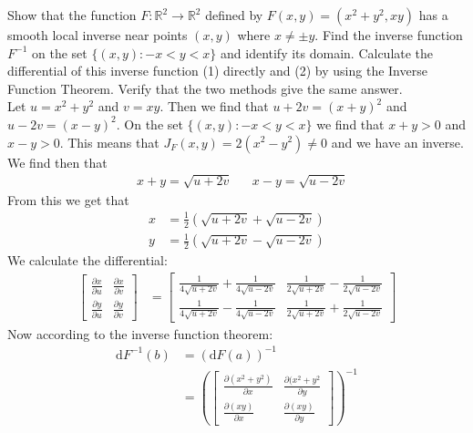 \documentclass[12pt]{book}
\newcommand{\R}{\mathbb{R}}
\newenvironment{exercise}[2][Exercise]{\begin{trivlist}
\item[\hskip \labelsep {\bfseries #1}\hskip \labelsep {\bfseries #2.}]}{\end{trivlist}}
\begin{document}
\begin{exercise}{9.6.2}
    Show that the function $F: \R^2 \to \R^2$ defined by $F(x,y) = (x^2+y^2, x y)$ has a smooth local inverse near points $(x,y)$ where $x \neq \pm y$. Find the inverse function $F^{-1}$ on the set $\{(x,y) : -x < y < x\}$ and identify its domain. Calculate the differential of this inverse function (1) directly and (2) by using the Inverse Function Theorem. Verify that the two methods give the same answer.  \\

    Let $u=x^2+y^2$ and $v = x y$. Then we find that $u+2v = (x+y)^2$ and $u-2v=(x-y)^2$. On the set $\{(x,y) : -x < y < x\}$ we find that $x+y>0$ and $x-y>0$. This means that $J_F (x,y) = 2 (x^2-y^2)\neq 0$ and we have an inverse. We find then that
    \begin{align*}
        &x+y=\sqrt{u+2v}        &&x-y=\sqrt{u-2v}
    \end{align*}
    From this we get that
    \begin{align*}
        x &= \frac{1}{2} \left( \sqrt{u+2v} + \sqrt{u-2v} \right) \\
        y &= \frac{1}{2} \left( \sqrt{u+2v} - \sqrt{u-2v} \right)
    \end{align*}
    We calculate the differential:
    \begin{align*}
    \begin{bmatrix} \frac{\partial x}{\partial u} & \frac{\partial x}{\partial v} \\ \frac{\partial y}{\partial u} & \frac{\partial y}{\partial v} \end{bmatrix} &= \left[\begin{matrix}\frac{1}{4 \sqrt{u + 2 v}} + \frac{1}{4 \sqrt{u - 2 v}} & \frac{1}{2 \sqrt{u + 2 v}} - \frac{1}{2 \sqrt{u - 2 v}}\\\frac{1}{4 \sqrt{u + 2 v}} - \frac{1}{4 \sqrt{u - 2 v}} & \frac{1}{2 \sqrt{u + 2 v}} + \frac{1}{2 \sqrt{u - 2 v}}\end{matrix}\right]
    \end{align*}
    Now according to the inverse function theorem:
    \begin{align*}
        \text{d} F^{-1} (b) &= \left( \text{d}F(a) \right)^{-1} \\
                            &= \left( \begin{bmatrix} \frac{\partial (x^2+y^2)}{\partial x} & \frac{\partial (x^2+y^2}{\partial y} \\ \frac{\partial(xy)}{\partial x} & \frac{\partial(xy)}{\partial y} \end{bmatrix} \right)^{-1} \\

\end{align*}
\end{exercise}
\end{document}

